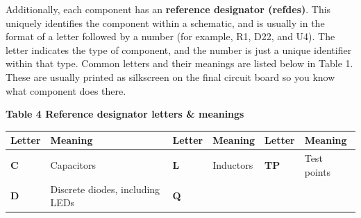 \documentclass[letterpaper]{article}
\begin{document}
{\sffamily\color[rgb]{0.30980393,0.5058824,0.7411765}
Additionally, each component has an \textbf{reference designator (refdes)}. This uniquely identifies the component
within a schematic, and is usually in the format of a letter followed by a number (for example, R1, D22, and U4). The
letter indicates the type of component, and the number is just a unique identifier within that type. Common letters and
their meanings are listed below in Table 1. These are usually printed as silkscreen on the final circuit board so you
know what component does there.}

\clearpage
\bigskip

{\sffamily\bfseries\color[rgb]{0.30980393,0.5058824,0.7411765}
Table 4 Reference designator letters \& meanings}

\begin{flushleft}
\tablefirsthead{}
\tablehead{}
\tabletail{}
\tablelasttail{}
\begin{supertabular}{|m{0.42475984in}|m{1.9219599in}|m{0.42055985in}|m{1.9233599in}|m{0.41915986in}|m{1.9247599in}|}
\hline
{\sffamily\bfseries\color[rgb]{0.30980393,0.5058824,0.7411765} Letter} &
{\sffamily\bfseries\color[rgb]{0.30980393,0.5058824,0.7411765} Meaning} &
{\sffamily\bfseries\color[rgb]{0.30980393,0.5058824,0.7411765} Letter} &
{\sffamily\bfseries\color[rgb]{0.30980393,0.5058824,0.7411765} Meaning} &
{\sffamily\bfseries\color[rgb]{0.30980393,0.5058824,0.7411765} Letter} &
{\sffamily\bfseries\color[rgb]{0.30980393,0.5058824,0.7411765} Meaning}\\\hline
{\sffamily\bfseries\color[rgb]{0.30980393,0.5058824,0.7411765} C} &
{\sffamily\color[rgb]{0.30980393,0.5058824,0.7411765} Capacitors} &
{\sffamily\bfseries\color[rgb]{0.30980393,0.5058824,0.7411765} L} &
{\sffamily\color[rgb]{0.30980393,0.5058824,0.7411765} Inductors} &
{\sffamily\bfseries\color[rgb]{0.30980393,0.5058824,0.7411765} TP} &
{\sffamily\color[rgb]{0.30980393,0.5058824,0.7411765} Test points}\\\hline
{\sffamily\bfseries\color[rgb]{0.30980393,0.5058824,0.7411765} D} &
{\sffamily\color[rgb]{0.30980393,0.5058824,0.7411765} Discrete diodes, including LEDs} &
{\sffamily\bfseries\color[rgb]{0.30980393,0.5058824,0.7411765} Q} &

\end{supertabular}
\end{flushleft}
\end{document}
